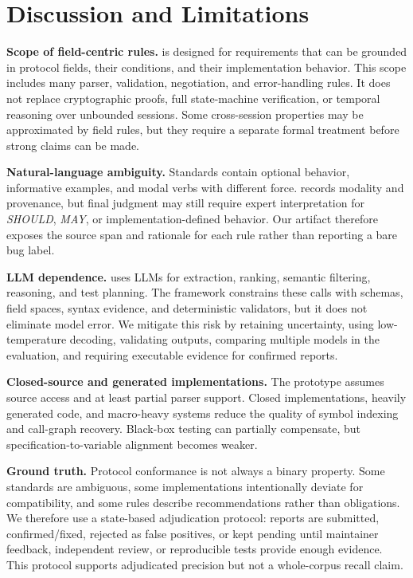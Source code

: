 \section{Discussion and Limitations}
\label{sec:discussion}

\textbf{Scope of field-centric rules.}
\tool{} is designed for requirements that can be grounded in protocol fields,
their conditions, and their implementation behavior. This scope includes many
parser, validation, negotiation, and error-handling rules. It does not replace
cryptographic proofs, full state-machine verification, or temporal reasoning
over unbounded sessions. Some cross-session properties may be approximated by
field rules, but they require a separate formal treatment before strong claims
can be made.

\textbf{Natural-language ambiguity.}
Standards contain optional behavior, informative examples, and modal verbs with
different force. \tool{} records modality and provenance, but final judgment may
still require expert interpretation for \emph{SHOULD}, \emph{MAY}, or
implementation-defined behavior. Our artifact therefore exposes the source span
and rationale for each rule rather than reporting a bare bug label.

\textbf{LLM dependence.}
\tool{} uses LLMs for extraction, ranking, semantic filtering, reasoning, and
test planning. The framework constrains these calls with schemas, field spaces,
syntax evidence, and deterministic validators, but it does not eliminate model
error. We mitigate this risk by retaining uncertainty, using low-temperature
decoding, validating outputs, comparing multiple models in the evaluation, and
requiring executable evidence for confirmed reports.

\textbf{Closed-source and generated implementations.}
The prototype assumes source access and at least partial parser support. Closed
implementations, heavily generated code, and macro-heavy systems reduce the
quality of symbol indexing and call-graph recovery. Black-box testing can
partially compensate, but specification-to-variable alignment becomes weaker.

\textbf{Ground truth.}
Protocol conformance is not always a binary property. Some standards are
ambiguous, some implementations intentionally deviate for compatibility, and
some rules describe recommendations rather than obligations. We therefore use a
state-based adjudication protocol: reports are submitted, confirmed/fixed,
rejected as false positives, or kept pending until maintainer feedback,
independent review, or reproducible tests provide enough evidence. This protocol
supports adjudicated precision but not a whole-corpus recall claim.

